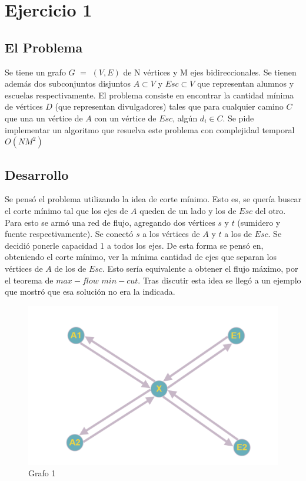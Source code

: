 \section{Ejercicio 1}
\subsection{El Problema}

Se tiene un grafo $G$ $=$ $(V,E)$ de N vértices y M ejes bidireccionales. Se tienen además dos subconjuntos disjuntos $A \subset V$ y $Esc \subset V$ que representan alumnos y escuelas respectivamente. El problema consiste en encontrar la cantidad mínima de vértices $D$ (que representan divulgadores)  tales que para cualquier camino $C$ que una un vértice de $A$ con un vértice de $Esc$, algún $d_i \in C$. Se pide implementar un algoritmo que resuelva este problema con complejidad temporal $O(NM^2)$

\subsection{Desarrollo}

Se pensó el problema utilizando la idea de corte mínimo. Esto es, se quería buscar el corte mínimo tal que los ejes de $A$ queden de un lado y los de $Esc$ del otro. Para esto se armó una red de flujo, agregando dos vértices $s$ y $t$ (sumidero y fuente respectivamente). Se conectó $s$ a los vértices de $A$ y $t$ a los de $Esc$. Se decidió ponerle capacidad 1 a todos los ejes. De esta forma se pensó en, obteniendo el corte mínimo, ver la mínima cantidad de ejes que separan los vértices de $A$ de los de $Esc$. Esto sería equivalente a obtener el flujo máximo, por el teorema de $max-flow$ $min-cut$. Tras discutir esta idea se llegó a un ejemplo que mostró que esa solución no era la indicada.


\begin{figure}[H]
\centering
\includegraphics[width=15cm]{Imagenes/Ej1a.png}
\caption{Grafo 1}
\end{figure}

